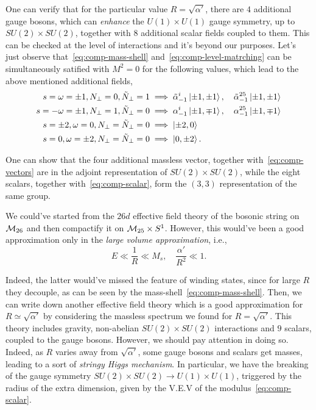 One can verify that for the particular value $R = \sqrt{\alpha'}$, there are $4$ additional gauge bosons, which can \emph{enhance} the $U(1) \times U(1)$ gauge symmetry, up to $SU(2) \times SU(2)$, together with $8$ additional scalar fields coupled to them. This can be checked at the level of interactions and it's beyond our purposes. Let's just observe that~\eqref{eq:comp-mass-shell} and~\eqref{eq:comp-level-matrching} can be simultaneously satified with $M^2=0$ for the following values, which lead to the above mentioned additional fields,
\begin{subequations}
\begin{align}
    s=\omega = \pm 1, N_\perp = 0, \tilde{N}_\perp = 1 &\implies \tilde{\alpha}^i_{-1} \ket{\pm 1, \pm 1}, \quad \tilde{\alpha}^{25}_{-1}\ket{\pm 1, \pm 1} \\
    s= -\omega = \pm 1, N_\perp = 1, \tilde{N}_\perp = 0 &\implies \alpha^i_{-1} \ket{\pm 1, \mp 1}, \quad \alpha^{25}_{-1}\ket{\pm 1, \mp 1} \\
    s = \pm 2, \omega = 0, N_\perp = \tilde{N}_\perp = 0 &\implies \ket{\pm 2, 0} \\
    s = 0, \omega = \pm 2, N_\perp = \tilde{N}_\perp = 0 &\implies \ket{0, \pm 2}. 
\end{align}
\end{subequations}

One can show that the four additional massless vector, together with~\eqref{eq:comp-vectors} are in the adjoint representation of $SU(2) \times SU(2)$, while the eight scalars, together with~\eqref{eq:comp-scalar}, form the $(3,3)$ representation of the same group.

We could've started from the $26d$ effective field theory of the bosonic string on $\mathcal{M}_{26}$ and then compactify it on $\mathcal{M}_{25} \times S^1$. However, this would've been a good approximation only in the \emph{large volume approximation}, i.e.,
\begin{equation}\label{eq:large-volume-approx}
    E \ll \frac{1}{R} \ll M_s, \quad \frac{\alpha'}{R^2} \ll 1.
\end{equation}

Indeed, the latter would've missed the feature of winding states, since for large $R$ they decouple, as can be seen by the mass-shell~\eqref{eq:comp-mass-shell}. Then, we can write down another effective field theory which is a good approximation for $R \simeq \sqrt{\alpha'}$ by considering the massless spectrum we found for $R = \sqrt{\alpha'}$. This theory includes gravity, non-abelian $SU(2) \times SU(2)$ interactions and $9$ scalars, coupled to the gauge bosons. However, we should pay attention in doing so. Indeed, as $R$ varies away from $\sqrt{\alpha'}$, some gauge bosons and scalars get masses, leading to a sort of \emph{stringy Higgs mechanism}. In particular, we have the breaking of the gauge symmetry $SU(2) \times SU(2) \to U(1) \times U(1)$, triggered by the radius of the extra dimension, given by the V.E.V of the modulus~\eqref{eq:comp-scalar}.

